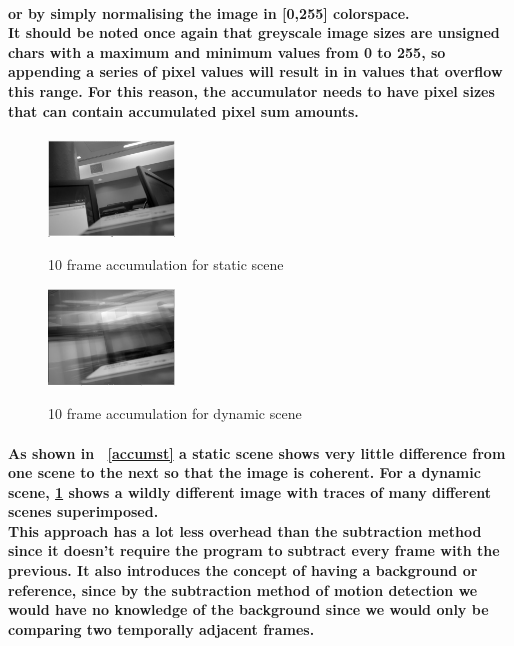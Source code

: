 \documentclass[11pt]{article} %
\begin{document}
\paragraph{
or by simply normalising the image in [0,255] colorspace.
\\It should be noted once again that greyscale image sizes are unsigned chars with a maximum and minimum values from 0 to 255, so appending a series of pixel values will result in in values that overflow this range. For this reason, the accumulator needs to have pixel sizes that can contain accumulated pixel sum amounts.
}
\begin{figure}
	\vspace{-20pt}
	\begin{center}
		\includegraphics[width=0.3\textwidth]{images/accumstatic}
		\label{accumst}
	\end{center}
	\vspace{-20pt}
	\caption{10 frame accumulation for static scene}
	\vspace{10pt}
	\begin{center}
		\includegraphics[width=0.3\textwidth]{images/accumdynamic}
		\label{accumdy}
	\end{center}
	\vspace{-20pt}
	\caption{10 frame accumulation for dynamic scene}
\end{figure}
\paragraph{As shown in ~\cref{accumst} a static scene shows very little difference from one scene to the next so that the image is coherent. For a dynamic scene, \cref{accumdy} shows a wildly different image with traces of many different scenes superimposed.
\\This approach has a lot less overhead than the subtraction method since it doesn’t require the program to subtract every frame with the previous. It also introduces the concept of having a background or reference, since by the subtraction method of motion detection we would have no knowledge of the background since we would only be comparing two temporally adjacent frames.
}
\end{document}
